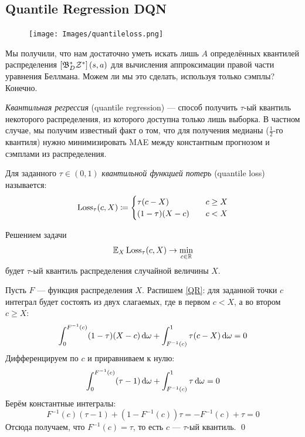 \subsection{Quantile Regression DQN}\label{subsec:qrdqn}

\begin{figure}
\vspace{-0.5cm}
\centering
\texttt{[image: Images/quantileloss.png]}
\vspace{-1.2cm}
\end{figure}

Мы получили, что нам достаточно уметь искать лишь $A$ определённых квантилей распределения $\left[ \mathfrak{B}^*_D \mathcal{Z}^* \right](s, a)$ для вычисления аппроксимации правой части уравнения Беллмана. Можем ли мы это сделать, используя только сэмплы? Конечно. 

\emph{Квантильная регрессия} (quantile regression) --- способ получить $\tau$-ый квантиль некоторого распределения, из которого доступна только лишь выборка. В частном случае, мы получим известный факт о том, что для получения медианы ($\frac{1}{2}$-го квантиля) нужно минимизировать MAE между константным прогнозом и сэмплами из распределения.

\begin{definition}
Для заданного $\tau \in (0, 1)$ \emph{квантильной функцией потерь} (quantile loss) называется:
\begin{equation}\label{quantileloss}
\operatorname{Loss}_{\tau}(c, X) \coloneqq \begin{cases}
\tau (c - X) \quad &c \ge X \\
(1 - \tau) (X - c) \quad &c < X \\
\end{cases}
\end{equation}
\end{definition}

\begin{theorem} Решением задачи
\begin{equation}\label{QR}
\mathbb{E}_X \operatorname{Loss}_{\tau}(c, X) \to \min_{c \in \mathbb{R}}
\end{equation}
будет $\tau$-ый квантиль распределения случайной величины $X$.

\beginproof
Пусть $F$ --- функция распределения $X$. Распишем \eqref{QR}: для заданной точки $c$ интеграл будет состоять из двух слагаемых, где в первом $c < X$, а во втором $c \ge X$:
\begin{equation*}
\int_0^{F^{-1}(c)} (1 - \tau)(X - c) \mathop{}\!\mathrm{d} \omega + \int_{F^{-1}(c)}^1 \tau (c - X) \mathop{}\!\mathrm{d} \omega = 0 
\end{equation*}
Дифференцируем по $c$ и приравниваем к нулю:
\begin{equation*}
\int_0^{F^{-1}(c)} (\tau - 1) \mathop{}\!\mathrm{d} \omega + \int_{F^{-1}(c)}^1 \tau \mathop{}\!\mathrm{d} \omega = 0 
\end{equation*}
Берём константные интегралы:
\begin{equation*}
F^{-1}(c)(\tau - 1) + (1 - F^{-1}(c)) \tau = -F^{-1}(c) + \tau = 0
\end{equation*}
Отсюда получаем, что $F^{-1}(c) = \tau$, то есть $c$ --- $\tau$-ый квантиль. \qed
\end{theorem}

